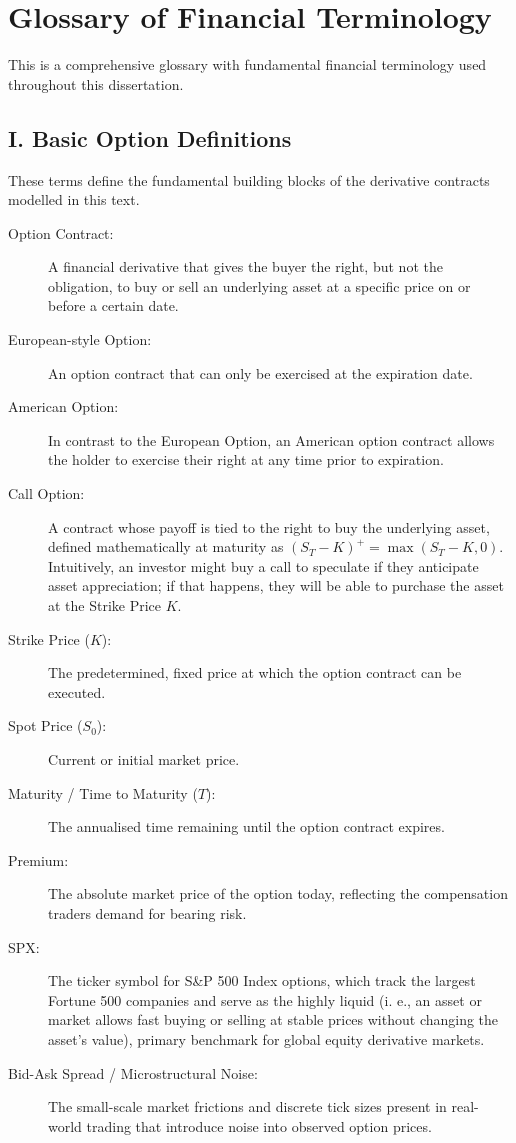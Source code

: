 \documentclass[12pt,oneside]{report}
\theoremstyle{definition}
\theoremstyle{remark}
\begin{document}
\newpage
\tableofcontents
\listoffigures
\listoftables

\clearpage
{}

\chapter*{Glossary of Financial Terminology}
\label{sec:glossary}

This is a comprehensive glossary with fundamental financial terminology used throughout this dissertation.

\section*{I. Basic Option Definitions}
{}
\label{sec:glossary_basic_option_definitions}
These terms define the fundamental building blocks of the derivative contracts modelled in this text.

\begin{description}
    \item[Option Contract:] A financial derivative that gives the buyer the right, but not the obligation, to buy or sell an underlying asset at a specific price on or before a certain date.
    \item[European-style Option:] An option contract that can only be exercised at the expiration date.
    \item[American Option:] In contrast to the European Option, an American option contract allows the holder to exercise their right at any time prior to expiration.
    \item[Call Option:] A contract whose payoff is tied to the right to buy the underlying asset, defined mathematically at maturity as $(S_T - K)^+ = \max(S_T - K, 0)$. Intuitively, an investor might buy a call to speculate if they anticipate asset appreciation; if that happens, they will be able to purchase the asset at the Strike Price $K$.
    \item[Strike Price ($K$):] The predetermined, fixed price at which the option contract can be executed.
    \item[Spot Price ($S_0$):] Current or initial market price.
    \item[Maturity / Time to Maturity ($T$):] The annualised time remaining until the option contract expires.
    \item[Premium:] The absolute market price of the option today, reflecting the compensation traders demand for bearing risk.
    \item[SPX:] The ticker symbol for S\&P 500 Index options, which track the largest Fortune 500 companies and serve as the highly liquid (i. e., an asset or market allows fast buying or selling at stable prices without changing the asset's value), primary benchmark for global equity derivative markets.
    \item[Bid-Ask Spread / Microstructural Noise:] The small-scale market frictions and discrete tick sizes present in real-world trading that introduce noise into observed option prices.
\end{description}
\end{document}
